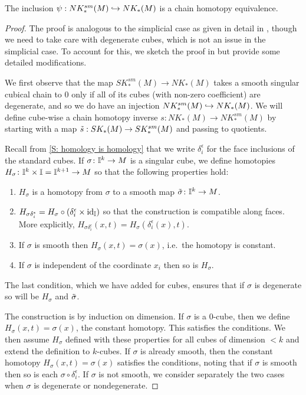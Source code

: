 \begin{proposition}\label{P: singular smooth cubes}
	The inclusion $\psi: NK^{sm}_*(M) \hookrightarrow NK_*(M)$ is a chain homotopy equivalence.
\end{proposition}

\begin{proof}
	The proof is analogous to the simplicial case as given in detail in \cite[Theorem 18.7]{Lee13}, though we need to take care with degenerate cubes, which is not an issue in the simplicial case. To account for this, we sketch the proof in \cite{Lee13} but provide some detailed modifications.

	We first observe that the map $SK^{sm}_*(M) \to NK_*(M)$ takes a smooth singular cubical chain to $0$ only if all of its cubes (with non-zero coefficient) are degenerate, and so we do have an injection $NK^{sm}_*(M) \hookrightarrow NK_*(M)$. We will define cube-wise a chain homotopy inverse $s \colon NK_*(M) \to NK^{sm}_*(M)$ by starting with a map $\tilde s:SK_*(M) \to SK^{sm}_*(M)$ and passing to quotients.

	Recall from \cref{S: homology is homology} that we write $\delta_i^\epsilon$ for the face inclusions of the standard cubes. If $\sigma \colon \mathbb{I}^k \to M$ is a singular cube, we define homotopies $H_\sigma \colon \mathbb{I}^k \times \mathbb{I} = \mathbb{I}^{k+1} \to M$ so that the following properties hold:
	\begin{enumerate}
		\item\label{I: smooth} $H_\sigma$ is a homotopy from $\sigma$ to a smooth map $\tilde \sigma \colon \mathbb{I}^k \to M$.

		\item\label{I: faces} $H_{\sigma \delta_i^\epsilon} = H_\sigma \circ (\delta_i^\epsilon \times \mathrm{id}_{\mathbb{I}})$ so that the construction is compatible along faces. More explicitly, $H_{\sigma \delta_i^\epsilon}(x,t) = H_\sigma(\delta_i^\epsilon(x),t)$.

		\item If $\sigma$ is smooth then $H_{\sigma}(x,t) = \sigma(x)$, i.e.\ the homotopy is constant.

		\item\label{I: degen} If $\sigma$ is independent of the coordinate $x_i$ then so is $H_\sigma$.
	\end{enumerate}

	The last condition, which we have added for cubes, ensures that if $\sigma$ is degenerate so will be $H_\sigma$ and $\tilde \sigma$.

	The construction is by induction on dimension. If $\sigma$ is a $0$-cube, then we define $H_\sigma(x,t) = \sigma(x)$, the constant homotopy. This satisfies the conditions. We then assume $H_\sigma$ defined with these properties for all cubes of dimension $<k$ and extend the definition to $k$-cubes. If $\sigma$ is already smooth, then the constant homotopy $H_\sigma(x,t) = \sigma(x)$ satisfies the conditions, noting that if $\sigma$ is smooth then so is each $\sigma \circ \delta_i^\epsilon$. If $\sigma$ is not smooth, we consider separately the two cases when $\sigma$ is degenerate or nondegenerate.


\end{proof}
